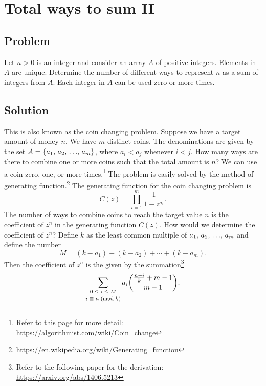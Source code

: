 
\section{Total ways to sum II}



\subsection*{Problem}

Let $n > 0$ is an integer and consider an array $A$ of positive
integers.  Elements in $A$ are unique.  Determine the number of
different ways to represent $n$ as a sum of integers from $A$.  Each
integer in $A$ can be used zero or more times.



\subsection*{Solution}

This is also known as the coin changing problem.  Suppose we have a
target amount of money $n$.  We have $m$ distinct coins.  The
denominations are given by the set $A = \left\{{{a}_1},\, {{a}_2},\, {\dots},\, {{a}_{m}}\right\}$, where
$a_i < a_j$ whenever $i < j$.  How many ways are there to combine one
or more coins such that the total amount is $n$?  We can use a coin
zero, one, or more times.\footnote{
  Refer to this page for more detail:
  \url{https://algorithmist.com/wiki/Coin_change}
}
The problem is easily solved by the method of generating
function.\footnote{
  \url{https://en.wikipedia.org/wiki/Generating_function}
}
The generating function for the coin changing problem is
\[
C(z)
=
\prod_{i=1}^{m}
\frac{
  1
}{
  1 - z^{a_i}
}.
\]
The number of ways to combine coins to reach the target value $n$ is
the coefficient of $z^n$ in the generating function $C(z)$.  How would
we determine the coefficient of $z^n$?  Define $k$ as the least common
multiple of ${{a}_1},\, {{a}_2},\, {\dots},\, {{a}_{m}}$ and define the number
\[
M
=
(k - a_1)
+
(k - a_2)
+
\cdots
+
(k - a_m).
\]
Then the coefficient of $z^n$ is the given by the summation\footnote{
  Refer to the following paper for the derivation:
  \url{https://arxiv.org/abs/1406.5213}
}
\[
\sum_{\substack{0 \; \leq \; i \; \leq \; M\\[2pt] {i} \; \equiv \; {n} \; (\text{mod}\; {k})}}
a_i
\binom{
  \frac{n-i}{k} + m - 1
}{
  m - 1
}.
\]

